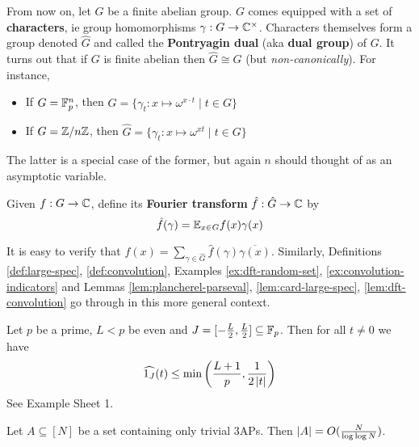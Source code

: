 \documentclass{article}
\begin{document}
From now on, let $G$ be a finite abelian group. $G$ comes equipped with a set of {\bf characters}, ie group homomorphisms $\gamma : G \to \mathbb C^\times$. Characters themselves form a group denoted $\hat G$ and called the {\bf Pontryagin dual} (aka {\bf dual group}) of $G$. It turns out that if $G$ is finite abelian then $\hat G \cong G$ (but {\it non-canonically}). For instance,
\begin{itemize}
  \item If $G = \mathbb F_p^n$, then $\hat G = \{\gamma_t : x \mapsto \omega^{x \cdot t} \mid t \in G\}$
  \item If $G = \mathbb Z/n\mathbb Z$, then $\hat G = \{\gamma_t : x \mapsto \omega^{xt} \mid t \in G\}$
\end{itemize}
The latter is a special case of the former, but again $n$ should thought of as an asymptotic variable.

\begin{ndef}
  Given $f : G \to \mathbb C$, define its {\bf Fourier transform} $\hat f : \hat G \to \mathbb C$ by
  $$\hat f(\gamma) = \mathbb E_{x \in G} f(x)\gamma(x)$$
\end{ndef}
It is easy to verify that $f(x) = \sum_{\gamma \in \hat G} \hat f(\gamma) \overline{\gamma(x)}$. Similarly, Definitions \ref{def:large-spec}, \ref{def:convolution}, Examples \ref{ex:dft-random-set}, \ref{ex:convolution-indicators} and Lemmas \ref{lem:plancherel-parseval}, \ref{lem:card-large-spec}, \ref{lem:dft-convolution} go through in this more general context.

\begin{nex}
  Let $p$ be a prime, $L < p$ be even and $J = [-\frac L2, \frac L2] \subseteq \mathbb F_p$. Then for all $t \ne 0$ we have
  $$\widehat{1_J}(t) \le \min\left(\frac{L + 1}p, \frac 1{2\left\lvert t\right\rvert}\right)$$
  See Example Sheet 1.
\end{nex}

\begin{nthm}[Roth]
  Let $A \subseteq [N]$ be a set containing only trivial 3APs. Then $\left\lvert A\right\rvert = O(\frac N{\log\log N})$.
\end{nthm}
\end{document}
